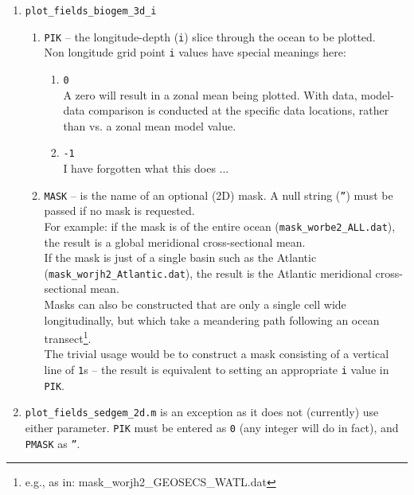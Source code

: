 \documentclass[11pt,fleqn]{book} %
\begin{document}
\begin{enumerate}
\vspace{2pt}
\item \texttt{plot\_fields\_biogem\_3d\_i}
\begin{enumerate}
\vspace{1pt}
\item \texttt{PIK} -- the longitude-depth (\texttt{i}) slice through the ocean to be plotted.
\\Non longitude grid point \texttt{i} values have special meanings here:
\begin{enumerate}[noitemsep]
\vspace{1pt}
\item \texttt{0}
\\A zero will result in a zonal mean being plotted. With data, model-data comparison is conducted at the specific data locations, rather than vs. a zonal mean model value.
\vspace{1pt}
\item \texttt{-1}
\\I have forgotten what this does ...
\end{enumerate}
\vspace{1pt}
\item \texttt{MASK} -- is the name of an optional (2D) mask. A null string (\texttt{''}) must be passed if no mask is requested.
\\ For example: if the mask is of the entire ocean (\texttt{mask\_worbe2\_ALL.dat}), the result is a global meridional cross-sectional mean.
\\ If the mask is just of a single basin such as the Atlantic (\texttt{mask\_worjh2\_Atlantic.dat}), the result is the Atlantic meridional cross-sectional mean.
\\ Masks can also be constructed that are only a single cell wide longitudinally, but which take a meandering path following an ocean transect\footnote{e.g., as in: \textsf{mask\_worjh2\_GEOSECS\_WATL.dat}}.
\\ The trivial usage would be to construct a mask consisting of a vertical line of \texttt{1}s -- the result is equivalent to setting an appropriate \texttt{i} value in \texttt{PIK}.
\end{enumerate}

\vspace{2pt}
\item \texttt{plot\_fields\_sedgem\_2d.m} is an exception as it does not (currently) use either parameter. \texttt{PIK} must be entered as \texttt{0} (any integer will do in fact), and \texttt{PMASK} as \texttt{''}.

\end{enumerate}
\vspace{4pt}
\end{document}
